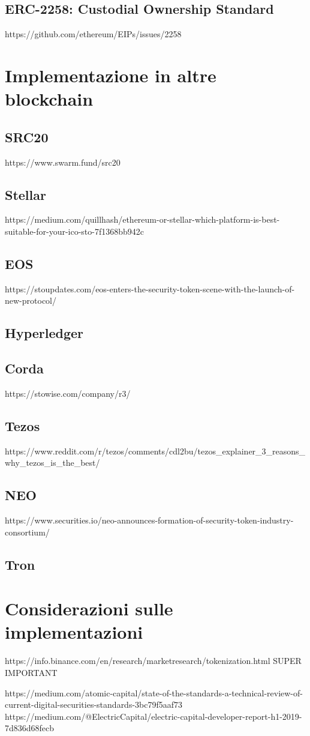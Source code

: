 \subsection{ERC-2258: Custodial Ownership Standard}
https://github.com/ethereum/EIPs/issues/2258
\section{Implementazione in altre blockchain}
\subsection{SRC20}
https://www.swarm.fund/src20
\subsection{Stellar}
https://medium.com/quillhash/ethereum-or-stellar-which-platform-is-best-suitable-for-your-ico-sto-7f1368bb942c
\subsection{EOS}
https://stoupdates.com/eos-enters-the-security-token-scene-with-the-launch-of-new-protocol/
\subsection{Hyperledger}
\subsection{Corda}
https://stowise.com/company/r3/
\subsection{Tezos}
https://www.reddit.com/r/tezos/comments/cdl2bu/tezos_explainer_3_reasons_why_tezos_is_the_best/
\subsection{NEO}
https://www.securities.io/neo-announces-formation-of-security-token-industry-consortium/
\subsection{Tron}
\section{Considerazioni sulle implementazioni}

https://info.binance.com/en/research/marketresearch/tokenization.html SUPER IMPORTANT

https://medium.com/atomic-capital/state-of-the-standards-a-technical-review-of-current-digital-securities-standards-3bc79f5aaf73
https://medium.com/@ElectricCapital/electric-capital-developer-report-h1-2019-7d836d68fecb